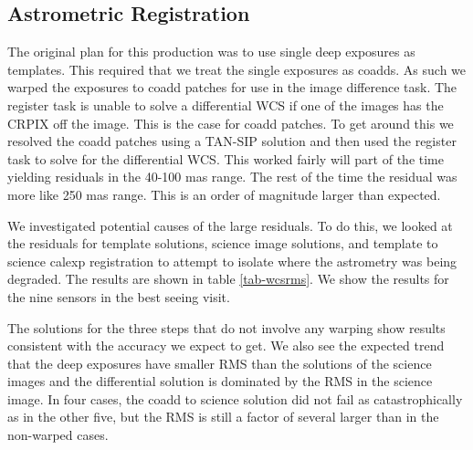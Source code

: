 \documentclass[prd, nofootinbib, floatfix, 11pt,tightenlines,times]{article}
\begin{document}
\subsection{Astrometric Registration \label{subsec-astrom}}
The original plan for this production was to use single deep exposures as 
templates.  This required that we treat the single exposures as coadds.  As 
such we warped the exposures to coadd patches for use in the image difference
task.  The register task is unable to solve a differential WCS if one of the images
has the CRPIX off the image.  This is the case for coadd patches.  To get around this
we resolved the coadd patches using a TAN-SIP solution and then used the register
task to solve for the differential WCS.  This worked fairly will part of the time 
yielding residuals in the 40-100 mas range.  The rest of the time the 
residual was more like 250 mas range.  This is an order of magnitude larger than expected.

We investigated potential causes of the large residuals.  To do this, we looked at the 
residuals for template solutions, science image solutions, and template to science calexp 
registration to attempt to isolate where the astrometry was being degraded.  The results are shown
in table \ref{tab-wcsrms}.  We show the results for the nine sensors in the best seeing visit.  

The solutions for the three steps that do not involve any warping show results consistent with 
the accuracy we expect to get.  We also see the expected trend that the deep exposures have 
smaller RMS than the solutions of the science images and the differential solution is dominated
by the RMS in the science image.  In four cases, the coadd to science solution did not fail
as catastrophically as in the other five, but the RMS is still a factor of several larger
than in the non-warped cases.
\end{document}
